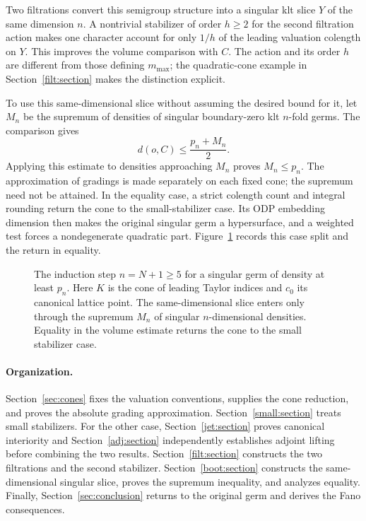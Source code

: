 Two filtrations convert this semigroup structure into a singular klt
slice \(Y\) of the same dimension \(n\). A nontrivial stabilizer
of order \(h\ge2\) for the second filtration action makes one
character account for only \(1/h\) of the leading valuation
colength on \(Y\). This improves the volume comparison with \(C\).
The action and its order \(h\) are different from those defining
\(m_{\max}\); the quadratic-cone example in
Section~\ref{filt:section} makes the distinction explicit.

To use this same-dimensional slice without assuming the desired bound
for it, let \(M_n\) be the supremum of densities of singular
boundary-zero klt \(n\)-fold germs. The comparison gives
\[
 d(o,C)\le\frac{p_n+M_n}{2}.
\]
Applying this estimate to densities approaching \(M_n\) proves
\(M_n\le p_n\). The approximation of gradings is made separately
on each fixed cone; the supremum need not be attained. In the equality
case, a strict colength count and integral rounding return the cone
to the small-stabilizer case. Its ODP embedding dimension then makes
the original singular germ a hypersurface, and a weighted test forces
a nondegenerate quadratic part. Figure~\ref{fig:route} records this
case split and the return in equality.

\begin{figure}[tb]
\centering

\caption{The induction step \(n=N+1\ge5\) for a singular germ of
density at least \(p_n\). Here \(K\) is the cone of leading Taylor
indices and \(c_0\) its canonical lattice point.
The same-dimensional slice enters only through the supremum \(M_n\)
of singular \(n\)-dimensional densities.
Equality in the volume estimate returns the cone to the small
stabilizer case.}
\label{fig:route}
\end{figure}

\paragraph{Organization.}
Section~\ref{sec:cones} fixes the valuation conventions, supplies the
cone reduction, and proves the absolute grading approximation.
Section~\ref{small:section} treats small stabilizers. For the other
case, Section~\ref{jet:section} proves canonical interiority and
Section~\ref{adj:section} independently establishes adjoint lifting
before combining the two results. Section~\ref{filt:section}
constructs the two filtrations and the second stabilizer.
Section~\ref{boot:section} constructs the same-dimensional singular
slice, proves the supremum inequality, and analyzes equality.
Finally, Section~\ref{sec:conclusion} returns to the original germ
and derives the Fano consequences.
